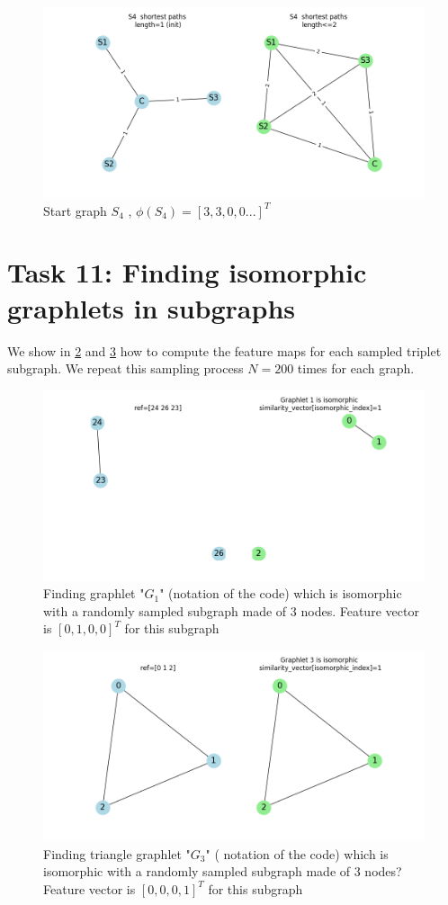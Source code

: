 \documentclass[a4paper]{article}
\begin{document}
\begin{figure}[ht]
    \centering
    \includegraphics[width=.6\textwidth]{figures/S4_shortest_paths_computation.png}
    \caption{Start graph $S_4$ , $\phi(S_4)=[3, 3, 0, 0 ...]^T$}
    \label{fig:S4_shortest_paths_computation}
\end{figure}

\pagebreak
\section*{Task 11: Finding isomorphic graphlets in subgraphs}
We show in \ref{fig:finding_isomorphic_graphlets_subgraphs} and \ref{fig:finding_isomorphic_graphlets_subgraphs_triangle}
how to compute the feature maps for each sampled triplet subgraph.
We repeat this sampling process $N=200$ times for each graph.
\begin{figure}[ht]
    \centering
    \includegraphics[width=.6\textwidth]{figures/finding_isomorphic_graphlets_subgraphs.png}
    \caption{Finding graphlet "$G_1$" (notation of the code) which is isomorphic with a randomly sampled subgraph made of 3 nodes.
    Feature vector is $[0, 1, 0, 0]^T$ for this subgraph}
    \label{fig:finding_isomorphic_graphlets_subgraphs}
\end{figure}

\begin{figure}[ht]
    \centering
    \includegraphics[width=.6\textwidth]{figures/finding_isomorphic_graphlets_subgraphs_triangle.png}
    \caption{Finding triangle graphlet "$G_3$" ( notation of the code) which is isomorphic with a randomly sampled subgraph made of 3 nodes?
    Feature vector is $[0, 0, 0, 1]^T$ for this subgraph}
    \label{fig:finding_isomorphic_graphlets_subgraphs_triangle}
\end{figure}
\pagebreak



\end{document}
